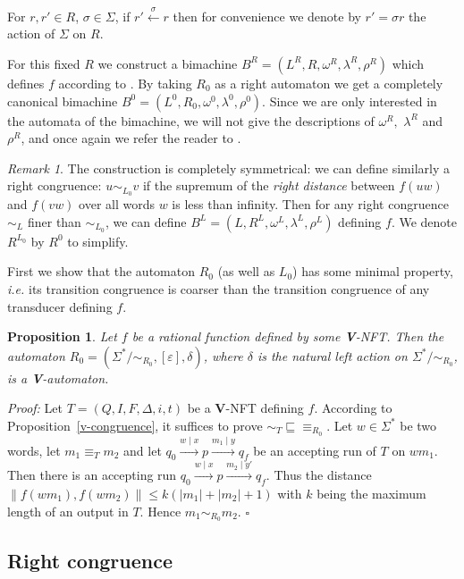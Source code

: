 \documentclass[12pt]{report}
\newtheorem{prp}{Proposition}[section]
\theoremstyle{definition}
\theoremstyle{remark}
\newtheorem{rmk}{Remark}[section]
\newenvironment{prf}
{\textit{Proof:}}
{\hfill $\square$\\}
\begin{document}
For $r,r'\in R$, $\sigma\in \Sigma$, if $r'\xleftarrow{\sigma}r$ then for convenience we denote by $r'=\sigma r$ the action of $\Sigma$ on $R$.

For this fixed $R$ we construct a bimachine $B^R=(L^R,R,\omega^R,\lambda^R,\rho^R)$ which defines $f$ according to \cite{reutenauers91}. By taking $R_0$ as a right automaton we get a completely canonical bimachine $B^0=(L^0,R_0,\omega^0,\lambda^0,\rho^0)$.
Since we are only interested in the automata of the bimachine, we will not give the descriptions of $\omega^R,$ $\lambda^R$ and $\rho^R$, and once again we refer the reader to \cite{reutenauers91}.

\begin{rmk}
The construction is completely symmetrical: we can define similarly a right congruence: $u\sim_{L_0}v$ if the supremum of the \emph{right distance} between $f(uw)$ and $f(vw)$ over all words $w$ is less than infinity.
Then for any right congruence $\sim_L$ finer than $\sim_{L_0}$, we can define $B^L=(L,R^L,\omega^L,\lambda^L,\rho^L)$ defining $f$. We denote $R^{L_0}$ by $R^0$ to simplify.
\end{rmk}

First we show that the automaton $R_0$ (as well as $L_0$) has some minimal property, \emph{i.e.} its transition congruence is coarser than the transition congruence of any transducer defining $f$.

\begin{prp}
\label{prp2}
Let $f$ be a rational function defined by some \textbf V-NFT.
Then the automaton $R_0=(\Sigma^\ast / \sim_{R_0},[\varepsilon],\delta)$,
where $\delta$ is the natural left action on $\Sigma^\ast / \sim_{R_0}$, is a \textbf V-automaton.
\end{prp}
\begin{prf}
Let $T=(Q,I,F,\Delta,i,t)$ be a \textbf V-NFT defining $f$.
According to Proposition~\ref{v-congruence}, it suffices to prove ${\sim_T}\sqsubseteq{\equiv_{R_0}}$.
Let $w\in \Sigma^\ast$ be two words, let $m_1\equiv_Tm_2$ and let $q_0\xrightarrow{w\mid x}p\xrightarrow{m_1\mid y}q_f$ be an accepting run of $T$ on $wm_1$.
Then there is an accepting run $q_0\xrightarrow{w\mid x}p\xrightarrow{m_2\mid y'}q_f$.
Thus the distance $\lVert f(wm_1),f(wm_2)\lVert\leq k(|m_1|+|m_2|+1)$ with $k$ being the maximum length of an output in $T$.
Hence $m_1\sim_{R_0} m_2$.
\end{prf}

\subsection{Right congruence}
\end{document}
